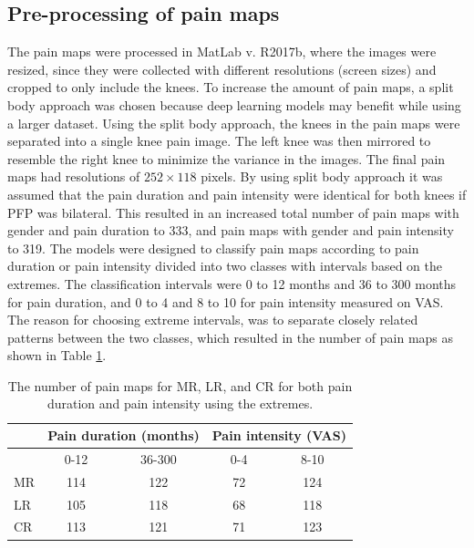 \subsection{Pre-processing of pain maps}
The pain maps were processed in MatLab v. R2017b, where the images were resized, since they were collected with different resolutions (screen sizes) and cropped to only include the knees. To increase the amount of pain maps, a split body approach was chosen because deep learning models may benefit while using a larger dataset. Using the split body approach, the knees in the pain maps were separated into a single knee pain image. The left knee was then mirrored to resemble the right knee to minimize the variance in the images. The final pain maps had resolutions of $252 \times 118$ pixels.
By using split body approach it was assumed that the pain duration and pain intensity were identical for both knees if PFP was bilateral. This resulted in an increased total number of pain maps with gender and pain duration to 333, and pain maps with gender and pain intensity to 319. \newline
\noindent
The models were designed to classify pain maps according to pain duration or pain intensity divided into two classes with intervals based on the extremes. The classification intervals were 0 to 12 months and 36 to 300 months for pain duration, and 0 to 4 and 8 to 10 for pain intensity measured on VAS. The reason for choosing extreme intervals, was to separate closely related patterns between the two classes, which resulted in the number of pain maps as shown in Table \ref{tab:painmaps}.

\begin{table}[H]
\centering
\begin{tabular}{@{}lcccc@{}}
\toprule
   & \multicolumn{2}{c}{Pain duration (months)} & \multicolumn{2}{c}{Pain intensity (VAS)} \\ \midrule
   & 0-12                & 36-300               & 0-4                & 8-10                \\ \midrule
MR & 114                 & 122                  & 72                 & 124                 \\
LR & 105                 & 118                  & 68                 & 118                 \\
CR & 113                 & 121                  & 71                 & 123                 \\ \bottomrule
\end{tabular}
\caption{The number of pain maps for MR, LR, and CR for both pain duration and pain intensity using the extremes.}
\label{tab:painmaps}
\end{table}

